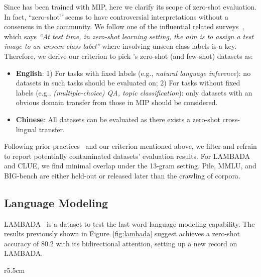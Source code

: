 Since \glm has been trained with MIP, here we clarify its scope of zero-shot evaluation.
In fact, ``zero-shot'' seems to have controversial interpretations without a consensus in the community. 
We follow one of the influential related surveys~\citep{xian2018zero}, which says 
\textit{``At test time, in zero-shot learning setting, the aim is to assign a test image to an unseen class label''}
where involving unseen class labels is a key. 
Therefore, we derive our criterion to pick \glm's zero-shot (and few-shot) datasets as:
\begin{itemize}[leftmargin=*,itemsep=0pt,parsep=0.2em,topsep=0.0em,partopsep=0.0em]
    \item \textbf{English}: 1) For tasks with fixed labels (e.g., \textit{natural language inference}): no datasets in such tasks should be evaluated on; 2) For tasks without fixed labels (e.g., \textit{(multiple-choice) QA, topic classification}): only datasets with an obvious domain transfer from those in MIP should be considered. %
    \item \textbf{Chinese}: All datasets can be evaluated as there exists a zero-shot cross-lingual transfer.
\end{itemize}

Following prior practices~\citep{brown2020language,rae2021scaling} and our criterion mentioned above, we filter and refrain to report potentially contaminated datasets' evaluation results.
For LAMBADA and CLUE, we find minimal overlap under the 13-gram setting.
Pile, MMLU, and BIG-bench are either held-out or released later than the crawling of corpora.

\subsection{Language Modeling} \label{sec:language_modeling}

LAMBADA~\citep{paperno2016lambada} is a dataset to test the last word language modeling capability.
The results previously shown in Figure~\ref{fig:lambada} suggest \glm achieves a zero-shot accuracy of 80.2 with its bidirectional attention, setting up a new record on LAMBADA.

\begin{wraptable}{r}{5.5cm}
	\centering
	\footnotesize
	\vspace{-6mm}
    \renewcommand\tabcolsep{2pt}
\renewcommand\arraystretch{1}
	\caption{\glm's average BPB on Pile evaluation (18 sub-datasets).}
	\vspace{-3mm}
    \vspace{-4mm}
\end{wraptable}

